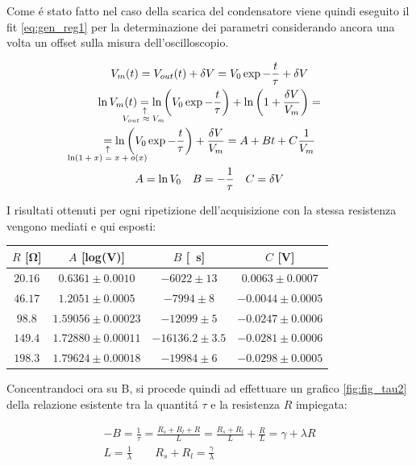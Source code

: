 \documentclass{article}
\newcommand{\equalexpl}[1]{
	\underset{\substack{\uparrow\\\mathrlap{\text{#1}}}}{=}}
\begin{document}
Come \'e stato fatto nel caso della scarica del condensatore viene quindi eseguito il fit \ref{eq:gen_reg1} per la determinazione dei parametri considerando ancora una volta un offset sulla misura dell'oscilloscopio.

\begin{gather}
	\nonumber
	V_m(t) = V_{out}(t) + \delta V =  V_0 \exp{ -\frac{t}{\tau} } + \delta V
	\\
	\nonumber
	\ln{V_m(t)} \equalexpl{\hspace{-2.5em}$V_{out} \approx V_m$} 
	\ln{\left( V_0 \exp{ -\frac{t}{\tau} } \right) } + 
	\ln{\left( 1 + \frac {\delta V}{V_{m}} \right) } = 
	\\
	\nonumber
	\equalexpl{\hspace{-4.5em}$\ln(1+x) = x + o(x)$} 
	\ln{\left( V_0 \exp{ -\frac{t}{\tau} } \right) } + 
	\frac {\delta V}{V_m} = A + B t + C\frac{1}{V_m}
	\\
	A = \ln{V_0} \quad B = -\frac{1}{\tau} \quad C = \delta V
	\label{eq:gen_reg1}
\end{gather}

I risultati ottenuti per ogni ripetizione dell'acquisizione con la stessa resistenza vengono mediati e qui esposti: 

\begin{center}
\begin{tabular}{c|c c c} 
	$R$ [\si{\ohm}] & $A$ [log(\si{\volt})] & $B$ [\si{\per\second}] & $C$ [\si{\volt}] \\
	[0.5ex]
	\hline
	$ 20.16 $&$ 0.6361\pm 0.0010 $&$ -6022\pm 13 $&$ 0.0063\pm 0.0007 $ \\
	$ 46.17 $&$ 1.2051\pm 0.0005 $&$ -7994\pm 8 $&$ -0.0044\pm 0.0005 $ \\
	$ 98.8 $&$ 1.59056\pm 0.00023 $&$ -12099\pm 5 $&$ -0.0247\pm 0.0006 $ \\
	$ 149.4 $&$ 1.72880\pm 0.00011 $&$ -16136.2\pm 3.5 $&$ -0.0281\pm 0.0006 $ \\
	$ 198.3 $&$ 1.79624\pm 0.00018 $&$ -19984\pm 6 $&$ -0.0298\pm 0.0005 $ \\
\end{tabular}
\end{center}

Concentrandoci ora su B, si procede quindi ad effettuare un grafico \ref{fig:fig_tau2} della relazione esistente tra la quantit\'a $\tau$ e la resistenza $R$ impiegata:

\begin{gather}
	- B = \frac{1}{\tau} = \frac{R_s + R_l + R}{L}= \frac{R_s + R_l}{L} + \frac{R}{L} = \gamma + \lambda R 
	\label{eq:tauind} \\
	\nonumber
	L = \frac{1}{\lambda} \qquad R_s + R_l = \frac{\gamma}{\lambda}
\end{gather}
\end{document}
